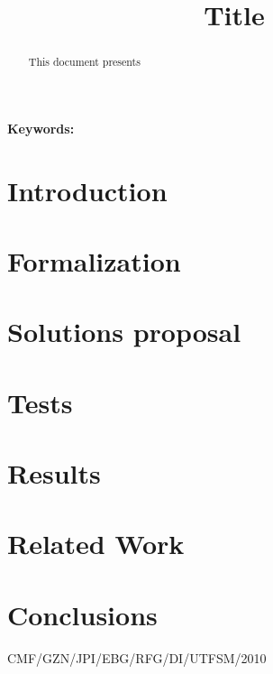 \documentclass[conference]{IEEEtran}
\title{Title}
\author{
\IEEEauthorblockN{
Rodrigo G. Fernández\IEEEauthorrefmark{1}
}
\IEEEauthorblockA{
\IEEEauthorrefmark{1}Computer Systems Research Group~\cite{CSRG}, Universidad Técnica Federico Santa María, Av. ~España~1680, Valparaíso, Chile
}
}
\begin{document}

\pagestyle{empty}

\maketitle\thispagestyle{empty}

\begin{abstract}
This document presents
\end{abstract}

\textbf{Keywords:} 

\section{Introduction}
\label{sec:intro}


\section{Formalization}
\label{sec:formalizacion}


\section{Solutions proposal}
\label{sec:solucion}


\section{Tests}
\label{sec:pruebas}


\section{Results}
\label{sec:resultados}


\section{Related Work}
\label{sec:soa}


\section{Conclusions}
\label{sec:conclusiones}




\vfill \hfill CMF/GZN/JPI/EBG/RFG/DI/UTFSM/2010
\end{document}
